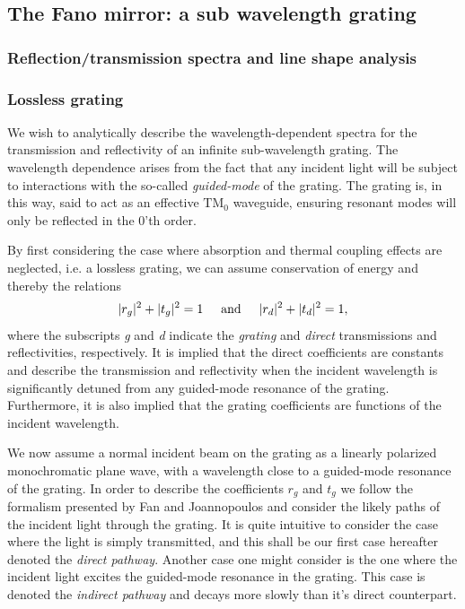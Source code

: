 \subsection{The Fano mirror: a sub wavelength grating}\label{sec:fano_mirror}

\subsubsection{Reflection/transmission spectra and line shape analysis}

\subsubsection{Lossless grating}

We wish to analytically describe the wavelength-dependent spectra for the transmission and reflectivity of an infinite sub-wavelength grating. The wavelength dependence arises from the fact that any incident light will be subject to interactions with the so-called \emph{guided-mode} of the grating. The grating is, in this way, said to act as an effective $\text{TM}_0$ waveguide, ensuring resonant modes will only be reflected in the 0'th order. 

By first considering the case where absorption and thermal coupling effects are neglected, i.e. a lossless grating, we can assume conservation of energy and thereby the relations
\begin{equation}
    |r_g|^2+|t_g|^2=1 \hspace{0.5cm} \text{and} \hspace{0.5cm} |r_d|^2+|t_d|^2=1,
    \label{eq:energy conservation}
\end{equation}
where the subscripts \emph{g} and \emph{d} indicate the \emph{grating} and \emph{direct} transmissions and reflectivities, respectively. It is implied that the direct coefficients are constants and describe the transmission and reflectivity when the incident wavelength is significantly detuned from any guided-mode resonance of the grating. Furthermore, it is also implied that the grating coefficients are functions of the incident wavelength.

We now assume a normal incident beam on the grating as a linearly polarized monochromatic plane wave, with a wavelength close to a guided-mode resonance of the grating. In order to describe the coefficients $r_g$ and $t_g$ we follow the formalism presented by Fan and Joannopoulos \cite{Fan-Joannopoulos-guided-mode-resonance} and consider the likely paths of the incident light through the grating. It is quite intuitive to consider the case where the light is simply transmitted, and this shall be our first case hereafter denoted the \emph{direct pathway}. Another case one might consider is the one where the incident light excites the guided-mode resonance in the grating. This case is denoted the \emph{indirect pathway} and decays more slowly than it's direct counterpart. 

